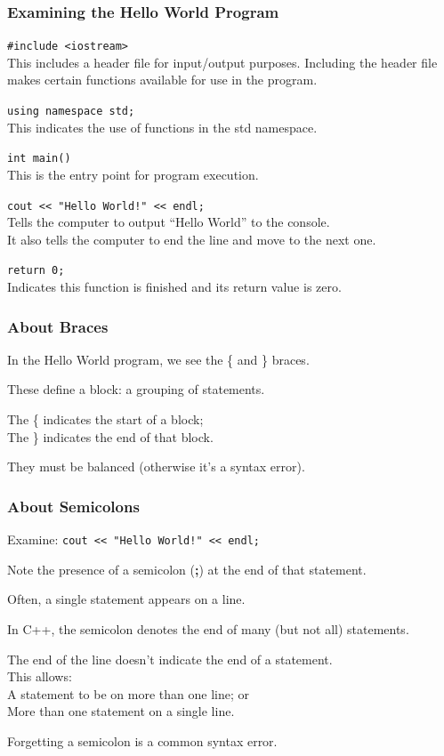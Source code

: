 \begin{frame}
\frametitle{Examining the Hello World Program}

\texttt{\#include <iostream>}\\
\quad This includes a header file for input/output purposes. Including the header file makes certain functions available for use in the program.

\texttt{using namespace std;}\\
\quad This indicates the use of functions in the std namespace.

\texttt{int main()}\\
\quad This is the entry point for program execution.

\texttt{cout << "Hello World!" << endl;}\\
\quad Tells the computer to output ``Hello World'' to the console.\\
\quad It also tells the computer to end the line and move to the next one.

\texttt{return 0;}\\
\quad Indicates this function is finished and its return value is zero.

\end{frame}

\begin{frame}
\frametitle{About Braces}

In the Hello World program, we see the \{ and \} braces.

These define a \alert{block}: a grouping of statements.

The \{ indicates the start of a block; \\
The \} indicates the end of that block.

They must be balanced (otherwise it's a syntax error).

\end{frame}

\begin{frame}
\frametitle{About Semicolons}

Examine: \texttt{cout << "Hello World!" << endl;}

Note the presence of a semicolon (\textbf{;}) at the end of that statement.

Often, a single statement appears on a line.

In C++, the semicolon denotes the end of many (but not all) statements.

The end of the line doesn't indicate the end of a statement.\\
This allows:\\
\quad\quad A statement to be on more than one line; or\\
\quad\quad More than one statement on a single line.

Forgetting a semicolon is a common syntax error.

\end{frame}

